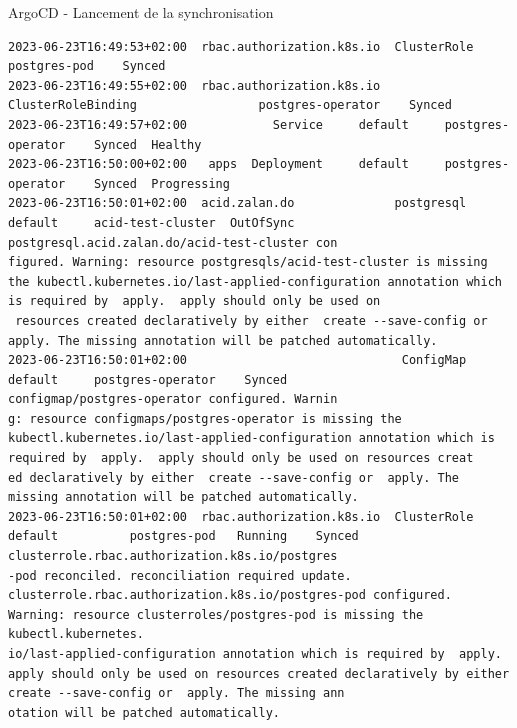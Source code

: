 \begin{frame}[fragile,shrink=1]{ArgoCD - Lancement de la synchronisation}
\begin{tiny}
\begin{Verbatim}[commandchars=\\\{\}]
2023-06-23T16:49:53+02:00  rbac.authorization.k8s.io  ClusterRole                      postgres-pod    Synced                                                                                 
2023-06-23T16:49:55+02:00  rbac.authorization.k8s.io  ClusterRoleBinding                 postgres-operator    Synced                                                                          
2023-06-23T16:49:57+02:00            Service     default     postgres-operator    Synced  Healthy                                                                                             
2023-06-23T16:50:00+02:00   apps  Deployment     default     postgres-operator    Synced  Progressing                                                                                         
2023-06-23T16:50:01+02:00  acid.zalan.do              postgresql             default     acid-test-cluster  OutOfSync                           postgresql.acid.zalan.do/acid-test-cluster con
figured. Warning: resource postgresqls/acid-test-cluster is missing the kubectl.kubernetes.io/last-applied-configuration annotation which is required by  apply.  apply should only be used on
 resources created declaratively by either  create --save-config or  apply. The missing annotation will be patched automatically.                                                             
2023-06-23T16:50:01+02:00                              ConfigMap             default     postgres-operator    Synced                            configmap/postgres-operator configured. Warnin
g: resource configmaps/postgres-operator is missing the kubectl.kubernetes.io/last-applied-configuration annotation which is required by  apply.  apply should only be used on resources creat
ed declaratively by either  create --save-config or  apply. The missing annotation will be patched automatically.                                                                             
2023-06-23T16:50:01+02:00  rbac.authorization.k8s.io  ClusterRole            default          postgres-pod   Running    Synced                  clusterrole.rbac.authorization.k8s.io/postgres
-pod reconciled. reconciliation required update. clusterrole.rbac.authorization.k8s.io/postgres-pod configured. Warning: resource clusterroles/postgres-pod is missing the kubectl.kubernetes.
io/last-applied-configuration annotation which is required by  apply.  apply should only be used on resources created declaratively by either  create --save-config or  apply. The missing ann
otation will be patched automatically.                                                                                                                                                        

\end{Verbatim}
\end{tiny}
\end{frame}
